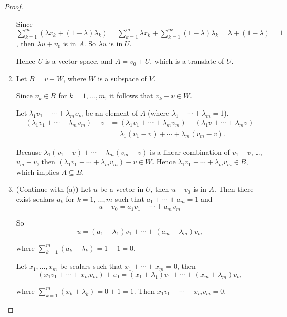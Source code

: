 \begin{proof}
\begin{enumerate}[label={(\alph*)}]
              Since $\sum^{m}_{k=1}(\lambda x_{k} + (1 - \lambda)\lambda_{k}) = \sum^{m}_{k=1}\lambda x_{k} + \sum^{m}_{k=1}(1 - \lambda)\lambda_{k} = \lambda + (1 - \lambda) = 1$, then $\lambda u + v_{0}$ is in $A$. So $\lambda u$ is in $U$.

              Hence $U$ is a vector space, and $A = v_{0} + U$, which is a translate of $U$.
        \item Let $B = v + W$, where $W$ is a subspace of $V$.

              Since $v_{k}\in B$ for $k = 1, \ldots, m$, it follows that $v_{k} - v\in W$.

              Let $\lambda_{1}v_{1} + \cdots + \lambda_{m}v_{m}$ be an element of $A$ (where $\lambda_{1} + \cdots + \lambda_{m} = 1$).
              \begin{align*}
                  (\lambda_{1}v_{1} + \cdots + \lambda_{m}v_{m}) - v & = (\lambda_{1}v_{1} + \cdots + \lambda_{m}v_{m}) - (\lambda_{1}v + \cdots + \lambda_{m}v) \\
                                                                     & = \lambda_{1}(v_{1} - v) + \cdots + \lambda_{m}(v_{m} - v).
              \end{align*}

              Because $\lambda_{1}(v_{1} - v) + \cdots + \lambda_{m}(v_{m} - v)$ is a linear combination of $v_{1} - v$, \ldots, $v_{m} - v$, then $(\lambda_{1}v_{1} + \cdots + \lambda_{m}v_{m}) - v\in W$. Hence $\lambda_{1}v_{1} + \cdots + \lambda_{m}v_{m}\in B$, which implies $A\subseteq B$.
        \item (Continue with (a)) Let $u$ be a vector in $U$, then $u + v_{0}$ is in $A$. Then there exist scalars $a_{k}$ for $k = 1, \ldots, m$ such that $a_{1} + \cdots + a_{m} = 1$ and
              \[
                  u + v_{0} = a_{1}v_{1} + \cdots + a_{m}v_{m}
              \]

              So
              \[
                  u = (a_{1} - \lambda_{1})v_{1} + \cdots + (a_{m} - \lambda_{m})v_{m}
              \]

              where $\sum^{m}_{k=1}(a_{k} - \lambda_{k}) = 1 - 1 = 0$.

              Let $x_{1}, \ldots, x_{m}$ be scalars such that $x_{1} + \cdots + x_{m} = 0$, then
              \[
                  (x_{1}v_{1} + \cdots + x_{m}v_{m}) + v_{0} = (x_{1} + \lambda_{1})v_{1} + \cdots + (x_{m} + \lambda_{m})v_{m}
              \]

              where $\sum^{m}_{k=1}(x_{k} + \lambda_{k}) = 0 + 1 = 1$. Then $x_{1}v_{1} + \cdots + x_{m}v_{m} = 0$.


\end{enumerate}
\end{proof}
